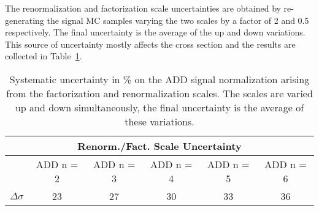The renormalization and factorization scale uncertainties are obtained by
re-generating the signal MC samples varying the two scales by a factor of 2 and
0.5 respectively. The final uncertainty is the average of the up and down
variations. This source of uncertainty mostly affects the cross section and the
results are collected in Table~\ref{tab:add_fact_ren_scale}.
\begin{table}[!ht]
  \centering
  \begin{tabular}{lccccc}
    \toprule
    \multicolumn{6}{c}{Renorm./Fact. Scale Uncertainty} \\
    \midrule \midrule
    \quad & ADD n = 2 & ADD n = 3 & ADD n = 4 & ADD n = 5 & ADD n = 6 \\
    $\Delta \sigma$ & 23 & 27 & 30 & 33 & 36 \\
    \bottomrule
  \end{tabular}
  \caption{Systematic uncertainty in \% on the ADD signal normalization arising from
    the factorization and renormalization scales. The scales are varied up and
    down simultaneously, the final uncertainty is the average of these
    variations.}
  \label{tab:add_fact_ren_scale}
\end{table}
